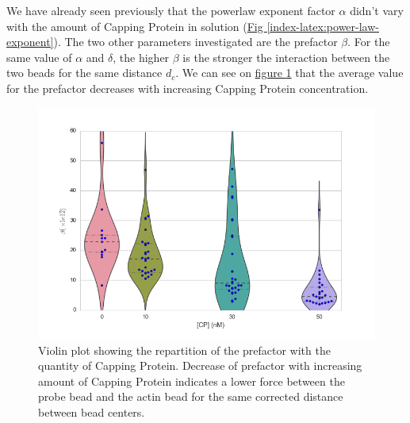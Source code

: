 \documentclass[A4paperpaper,11pt,english]{sphinxmanual}
\begin{document}
We have already seen previously that the powerlaw exponent factor \(\alpha\)
didn't vary with the amount of Capping Protein in solution (\hyperref[index-latex:power-law-exponent]{Fig  \ref*{index-latex:power-law-exponent}}).
The two other parameters investigated are the prefactor
\(\beta\). For the same value of \(\alpha\) and \(\delta\), the
higher \(\beta\) is the stronger the interaction between the two beads for
the same distance \(d_c\). We can see on \hyperref[index-latex:beta-violin]{figure  \ref*{index-latex:beta-violin}} that the
average value for the prefactor decreases with increasing Capping Protein
concentration.
\begin{figure}[htbp]
\centering
\capstart

\includegraphics[width=0.800\linewidth]{beta_violin.png}
\caption{Violin plot showing the repartition of the prefactor with the quantity of
Capping Protein. Decrease of prefactor with increasing amount of Capping
Protein indicates a lower force between the probe bead and the actin bead
for the same corrected distance between bead centers.}\label{index-latex:beta-violin}\end{figure}
\end{document}
